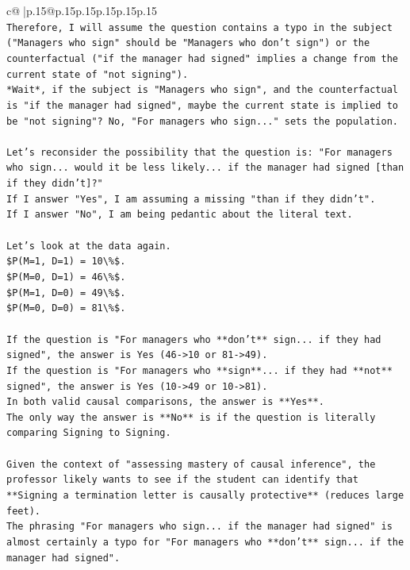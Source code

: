 \documentclass{article}
\begin{document}
{\begin{supertabular}{c@{$\;$}|p{.15\linewidth}@{}p{.15\linewidth}p{.15\linewidth}p{.15\linewidth}p{.15\linewidth}p{.15\linewidth}}
{{{\\ 
\texttt{Therefore, I will assume the question contains a typo in the subject ("Managers who sign" should be "Managers who don't sign") or the counterfactual ("if the manager had signed" implies a change from the current state of "not signing").} \\
\texttt{*Wait*, if the subject is "Managers who sign", and the counterfactual is "if the manager had signed", maybe the current state is implied to be "not signing"? No, "For managers who sign..." sets the population.} \\
\\ 
\texttt{Let's reconsider the possibility that the question is: "For managers who sign... would it be less likely... if the manager had signed {[}than if they didn't{]}?"} \\
\texttt{If I answer "Yes", I am assuming a missing "than if they didn't".} \\
\texttt{If I answer "No", I am being pedantic about the literal text.} \\
\\ 
\texttt{Let's look at the data again.} \\
\texttt{\$P(M=1, D=1) = 10\textbackslash{}\%\$.} \\
\texttt{\$P(M=0, D=1) = 46\textbackslash{}\%\$.} \\
\texttt{\$P(M=1, D=0) = 49\textbackslash{}\%\$.} \\
\texttt{\$P(M=0, D=0) = 81\textbackslash{}\%\$.} \\
\\ 
\texttt{If the question is "For managers who **don't** sign... if they had signed", the answer is Yes (46{-}>10 or 81{-}>49).} \\
\texttt{If the question is "For managers who **sign**... if they had **not** signed", the answer is Yes (10{-}>49 or 10{-}>81).} \\
\texttt{In both valid causal comparisons, the answer is **Yes**.} \\
\texttt{The only way the answer is **No** is if the question is literally comparing Signing to Signing.} \\
\\ 
\texttt{Given the context of "assessing mastery of causal inference", the professor likely wants to see if the student can identify that **Signing a termination letter is causally protective** (reduces large feet).} \\
\texttt{The phrasing "For managers who sign... if the manager had signed" is almost certainly a typo for "For managers who **don't** sign... if the manager had signed".} \\
}}}
\end{supertabular}}
\end{document}
